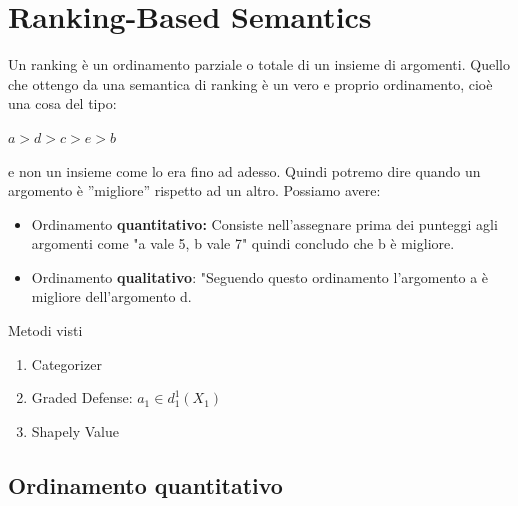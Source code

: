\section{Ranking-Based Semantics}
Un ranking è un ordinamento parziale o totale di un insieme di argomenti.
Quello che ottengo da una semantica di ranking è un vero e proprio
ordinamento, cioè una cosa del tipo:
\begin{center}
    $a > d > c > e >b$
\end{center}
e non un insieme come lo era fino ad adesso. Quindi potremo dire quando un
argomento è ”migliore” rispetto ad un altro. Possiamo avere:
\begin{itemize}
    \item Ordinamento \textbf{quantitativo:} Consiste nell'assegnare prima
          dei punteggi agli argomenti come "a vale 5, b vale 7" quindi concludo
          che b è migliore.
    \item Ordinamento \textbf{qualitativo}: "Seguendo questo ordinamento
          l'argomento a è migliore dell'argomento d.
\end{itemize}
\begin{center}
    Metodi visti
\end{center}
\begin{enumerate}
    \item Categorizer
    \item Graded Defense: $a_1 \in d^1_{1} (X_1)$
    \item Shapely Value
\end{enumerate}
\subsection{Ordinamento quantitativo}

